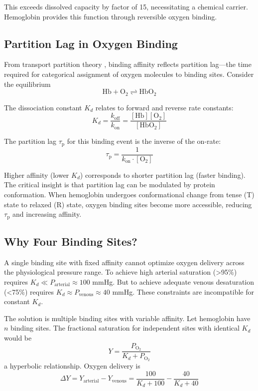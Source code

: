 \documentclass[12pt,a4paper]{article}
\theoremstyle{remark}
\newcommand{\taulag}{\tau_{\mathrm{p}}}
\begin{document}
This exceeds dissolved capacity by factor of 15, necessitating a chemical carrier. Hemoglobin provides this function through reversible oxygen binding.

\subsection{Partition Lag in Oxygen Binding}

From transport partition theory \cite{sachikonye2024transport}, binding affinity reflects partition lag—the time required for categorical assignment of oxygen molecules to binding sites. Consider the equilibrium
\begin{equation}
\mathrm{Hb} + \mathrm{O}_{2} \rightleftharpoons \mathrm{HbO}_{2}
\end{equation}

The dissociation constant $K_{d}$ relates to forward and reverse rate constants:
\begin{equation}
K_{d} = \frac{k_{\mathrm{off}}}{k_{\mathrm{on}}} = \frac{[\mathrm{Hb}][\mathrm{O}_{2}]}{[\mathrm{HbO}_{2}]}
\end{equation}

The partition lag $\taulag$ for this binding event is the inverse of the on-rate:
\begin{equation}
\taulag = \frac{1}{k_{\mathrm{on}} \cdot [\mathrm{O}_{2}]}
\end{equation}

Higher affinity (lower $K_{d}$) corresponds to shorter partition lag (faster binding). The critical insight is that partition lag can be modulated by protein conformation. When hemoglobin undergoes conformational change from tense (T) state to relaxed (R) state, oxygen binding sites become more accessible, reducing $\taulag$ and increasing affinity.

\subsection{Why Four Binding Sites?}

A single binding site with fixed affinity cannot optimize oxygen delivery across the physiological pressure range. To achieve high arterial saturation (>95\%) requires $K_{d} \ll P_{\mathrm{arterial}} \approx 100$ mmHg. But to achieve adequate venous desaturation (<75\%) requires $K_{d} \approx P_{\mathrm{venous}} \approx 40$ mmHg. These constraints are incompatible for constant $K_{d}$.

The solution is multiple binding sites with variable affinity. Let hemoglobin have $n$ binding sites. The fractional saturation for independent sites with identical $K_{d}$ would be
\begin{equation}
Y = \frac{P_{\mathrm{O}_{2}}}{K_{d} + P_{\mathrm{O}_{2}}}
\end{equation}
a hyperbolic relationship. Oxygen delivery is
\begin{equation}
\Delta Y = Y_{\mathrm{arterial}} - Y_{\mathrm{venous}} = \frac{100}{K_{d} + 100} - \frac{40}{K_{d} + 40}
\end{equation}
\end{document}
